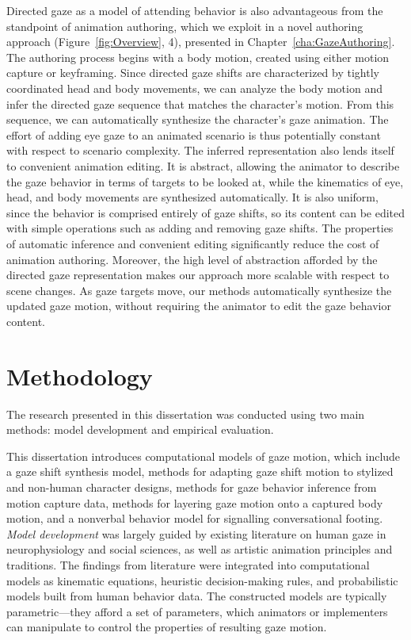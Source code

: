 Directed gaze as a model of attending behavior is also advantageous from the standpoint of animation authoring, which we exploit in a novel authoring approach (Figure~\ref{fig:Overview}, 4), presented in Chapter~\ref{cha:GazeAuthoring}. The authoring process begins with a body motion, created using either motion capture or keyframing. Since directed gaze shifts are characterized by tightly coordinated head and body movements, we can analyze the body motion and infer the directed gaze sequence that matches the character's motion. From this sequence, we can automatically synthesize the character's gaze animation. The effort of adding eye gaze to an animated scenario is thus potentially constant with respect to scenario complexity. The inferred representation also lends itself to convenient animation editing. It is abstract, allowing the animator to describe the gaze behavior in terms of targets to be looked at, while the kinematics of eye, head, and body movements are synthesized automatically. It is also uniform, since the behavior is comprised entirely of gaze shifts, so its content can be edited with simple operations such as adding and removing gaze shifts. The properties of automatic inference and convenient editing significantly reduce the cost of animation authoring. Moreover, the high level of abstraction afforded by the directed gaze representation makes our approach more scalable with respect to scene changes. As gaze targets move, our methods automatically synthesize the updated gaze motion, without requiring the animator to edit the gaze behavior content.

\section{Methodology}

The research presented in this dissertation was conducted using two main methods: model development and empirical evaluation.

This dissertation introduces computational models of gaze motion, which include a gaze shift synthesis model, methods for adapting gaze shift motion to stylized and non-human character designs, methods for gaze behavior inference from motion capture data, methods for layering gaze motion onto a captured body motion, and a nonverbal behavior model for signalling conversational footing. \emph{Model development} was largely guided by existing literature on human gaze in neurophysiology and social sciences, as well as artistic animation principles and traditions. The findings from literature were integrated into computational models as kinematic equations, heuristic decision-making rules, and probabilistic models built from human behavior data. The constructed models are typically parametric---they afford a set of parameters, which animators or implementers can manipulate to control the properties of resulting gaze motion.


